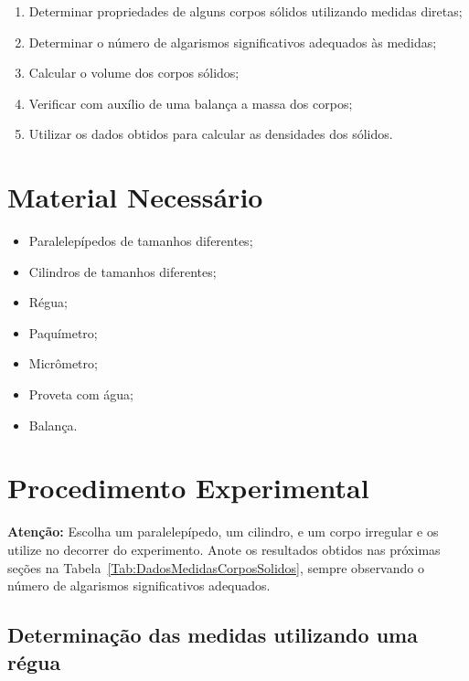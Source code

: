 \begin{enumerate}
     \item Determinar propriedades de alguns corpos sólidos utilizando medidas diretas;
     \item Determinar o número de algarismos significativos adequados às medidas;
     \item Calcular o volume dos corpos sólidos;
     \item Verificar com auxílio de uma balança a massa dos corpos;
     \item Utilizar os dados obtidos para calcular as densidades dos sólidos.
\end{enumerate}

\section{Material Necessário}

\begin{itemize}
	\item Paralelepípedos de tamanhos diferentes;
	\item Cilindros de tamanhos diferentes;
	\item Régua;
	\item Paquímetro;
	\item Micrômetro;
	\item Proveta com água;
	\item Balança.
\end{itemize}

\section{Procedimento Experimental}

\textbf{Atenção:} Escolha um paralelepípedo, um cilindro, e um corpo irregular e os utilize no decorrer do experimento. Anote os resultados obtidos nas próximas seções na Tabela~\ref{Tab:DadosMedidasCorposSolidos}, sempre observando o número de algarismos significativos adequados.

\subsection{Determinação das medidas utilizando uma régua}

